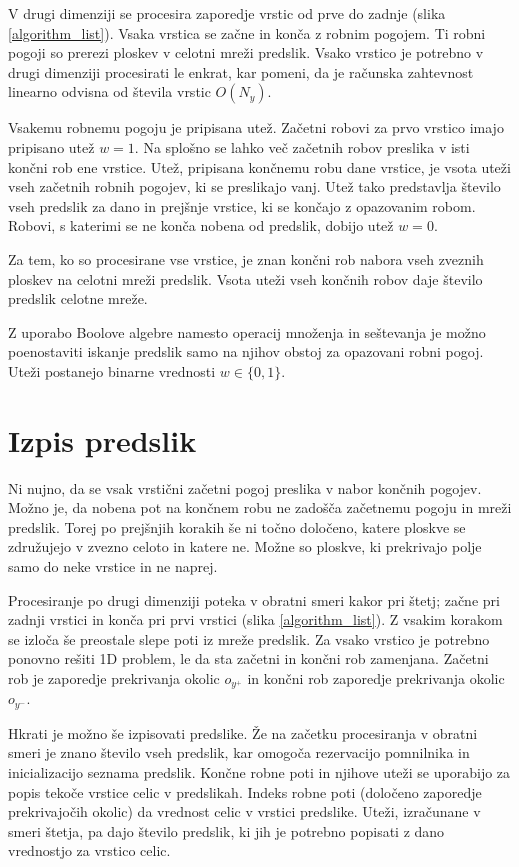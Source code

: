 \documentclass[12pt,a4paper,openany,twoside]{book}
\begin{document}
V drugi dimenziji se procesira zaporedje vrstic od prve do zadnje (slika \ref{algorithm_list}).
Vsaka vrstica se začne in konča z robnim pogojem.
Ti robni pogoji so prerezi ploskev v celotni mreži predslik.
Vsako vrstico je potrebno v drugi dimenziji procesirati le enkrat, kar pomeni,
da je računska zahtevnost linearno odvisna od števila vrstic \(O(N_y)\).

Vsakemu robnemu pogoju je pripisana utež. Začetni robovi za prvo vrstico imajo pripisano utež \(w=1\).
Na splošno se lahko več začetnih robov preslika v isti končni rob ene vrstice.
Utež, pripisana končnemu robu dane vrstice, je vsota uteži vseh začetnih robnih pogojev, ki se preslikajo vanj.
Utež tako predstavlja število vseh predslik za dano in prejšnje vrstice, ki se končajo z opazovanim robom.
Robovi, s katerimi se ne konča nobena od predslik, dobijo utež \(w=0\).

Za tem, ko so procesirane vse vrstice, je znan končni rob nabora vseh zveznih ploskev na celotni mreži predslik.
Vsota uteži vseh končnih robov daje število predslik celotne mreže.

Z uporabo Boolove algebre namesto operacij množenja in seštevanja
je možno poenostaviti iskanje predslik samo na njihov obstoj za opazovani robni pogoj.
Uteži postanejo binarne vrednosti \(w \in \{0, 1\}\).

\section{Izpis predslik}

Ni nujno, da se vsak vrstični začetni pogoj preslika v nabor končnih pogojev.
Možno je, da nobena pot na končnem robu ne zadošča začetnemu pogoju in mreži predslik.
Torej po prejšnjih korakih še ni točno določeno, katere ploskve se združujejo v zvezno
celoto in katere ne. Možne so ploskve, ki prekrivajo polje samo do neke vrstice in ne naprej.

Procesiranje po drugi dimenziji poteka v obratni smeri kakor pri štetj;
začne pri zadnji vrstici in konča pri prvi vrstici (slika \ref{algorithm_list}).
Z vsakim korakom se izloča še preostale slepe poti iz mreže predslik.
Za vsako vrstico je potrebno ponovno rešiti 1D problem,
le da sta začetni in končni rob zamenjana.
Začetni rob je zaporedje prekrivanja okolic \(o_{y^+}\)
in končni rob zaporedje prekrivanja okolic \(o_{y^-}\).

Hkrati je možno še izpisovati predslike. Že na začetku procesiranja v obratni smeri
je znano število vseh predslik, kar omogoča rezervacijo pomnilnika in inicializacijo seznama predslik.
Končne robne poti in njihove uteži se uporabijo za popis tekoče vrstice celic v predslikah.
Indeks robne poti (določeno zaporedje prekrivajočih okolic) da vrednost celic v vrstici predslike.
Uteži, izračunane v smeri štetja, pa dajo število predslik,
ki jih je potrebno popisati z dano vrednostjo za vrstico celic.
\end{document}

